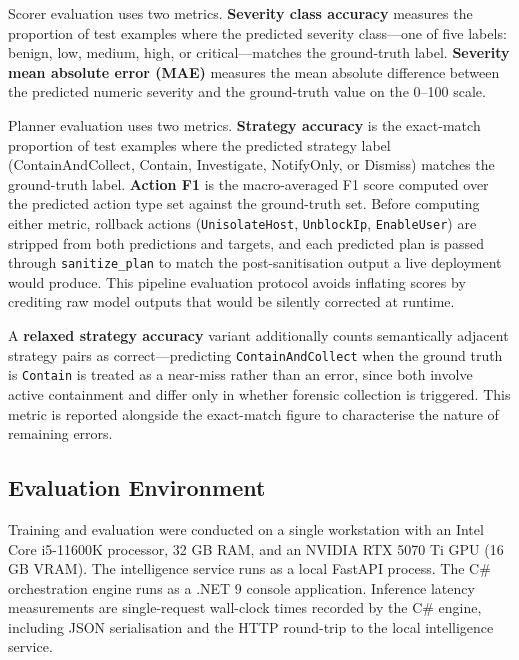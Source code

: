 Scorer evaluation uses two metrics. \textbf{Severity class accuracy} measures the proportion of test examples where the predicted severity class---one of five labels: benign, low, medium, high, or critical---matches the ground-truth label. \textbf{Severity mean absolute error (MAE)} measures the mean absolute difference between the predicted numeric severity and the ground-truth value on the 0--100 scale.

Planner evaluation uses two metrics. \textbf{Strategy accuracy} is the exact-match proportion of test examples where the predicted strategy label (ContainAndCollect, Contain, Investigate, NotifyOnly, or Dismiss) matches the ground-truth label. \textbf{Action F1} is the macro-averaged F1 score computed over the predicted action type set against the ground-truth set. Before computing either metric, rollback actions (\texttt{UnisolateHost}, \texttt{UnblockIp}, \texttt{EnableUser}) are stripped from both predictions and targets, and each predicted plan is passed through \texttt{sanitize\_plan} to match the post-sanitisation output a live deployment would produce. This pipeline evaluation protocol avoids inflating scores by crediting raw model outputs that would be silently corrected at runtime.

A \textbf{relaxed strategy accuracy} variant additionally counts semantically adjacent strategy pairs as correct---predicting \texttt{ContainAndCollect} when the ground truth is \texttt{Contain} is treated as a near-miss rather than an error, since both involve active containment and differ only in whether forensic collection is triggered. This metric is reported alongside the exact-match figure to characterise the nature of remaining errors.

\subsection{Evaluation Environment}

Training and evaluation were conducted on a single workstation with an Intel Core i5-11600K processor, 32 GB RAM, and an NVIDIA RTX 5070 Ti GPU (16 GB VRAM). The intelligence service runs as a local FastAPI process. The C\# orchestration engine runs as a .NET 9 console application. Inference latency measurements are single-request wall-clock times recorded by the C\# engine, including JSON serialisation and the HTTP round-trip to the local intelligence service.

